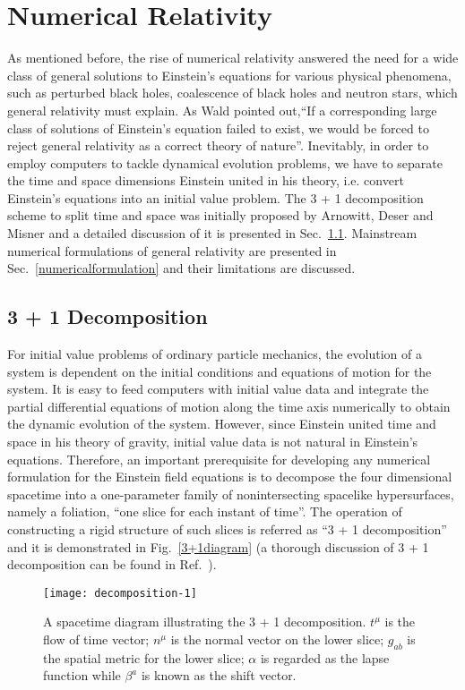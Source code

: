 \chapter{Numerical Relativity}\label{nr}
As mentioned before, the rise of numerical relativity answered the need for a wide class of general solutions to Einstein's equations for various physical phenomena, such as perturbed black holes, coalescence of black holes and neutron stars, which general relativity must explain. As Wald pointed out,``If a corresponding large class of solutions of Einstein's equation failed to exist, we would be forced to reject general relativity as a correct theory of nature''\cite{Wald:GRbook}. Inevitably, in order to employ computers to tackle dynamical evolution problems, we have to separate the time and space dimensions Einstein united in his theory, i.e. convert Einstein's equations into an initial value problem. The 3 + 1 decomposition scheme to split time and space was initially proposed by Arnowitt, Deser and Misner\cite{ADM:Witten} and a detailed discussion of it is presented in Sec.~\ref{3+1}. Mainstream numerical formulations of general relativity are presented in Sec.~\ref{numericalformulation} and their limitations are discussed. 
\section{3 + 1 Decomposition}\label{3+1}
For initial value problems of ordinary particle mechanics, the evolution of a system is dependent on the initial conditions and equations of motion for the system. It is easy to feed computers with initial value data and integrate the partial differential equations of motion along the time axis numerically to obtain the dynamic evolution of the system. However, since Einstein united time and space in his theory of gravity, initial value data is not natural in Einstein's equations. Therefore, an important prerequisite for developing any numerical formulation for the Einstein field equations is to decompose the four dimensional spacetime into a one-parameter family of nonintersecting spacelike hypersurfaces, namely a foliation, ``one slice for each instant of time''. The operation of constructing a rigid structure of such slices is referred as ``3 + 1 decomposition'' and it is demonstrated in Fig.~\ref{3+1diagram} (a thorough discussion of 3 + 1 decomposition can be found in Ref.~\cite{Gourgoulhon:2007ue}). 

\begin{figure}[hbtp]
\centering
\texttt{[image: decomposition-1]}
\caption{A spacetime diagram illustrating the 3 + 1 decomposition. $t^{\mu}$ is the flow of time vector; $n^{\mu}$ is the normal vector on the lower slice; $g_{ab}$ is the spatial metric for the lower slice; $\alpha$ is regarded as the lapse function while $\beta^{a}$ is known as the shift vector. }
\end{figure}\label{3+1diagram}

